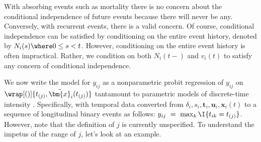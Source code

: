 \documentclass[article]{jss}
\begin{document}
With absorbing events such as mortality there is no concern about the
conditional independence of future events because there will never be
any.  Conversely, with recurrent events, there is a valid concern.  Of
course, conditional independence can be satisfied by conditioning on
the entire event history, denoted by $N_i(s) \where 0\le s < t$.
However, conditioning on the entire event history is often impractical.
Rather, we condition on both $N_i(t-)$ and $v_i(t)$ to satisfy any
concern of conditional independence.

We now write the model for $y_{ij}$ as a nonparametric probit
regression of $y_{ij}$ on
$\wrap[()]{t_{(j)}, \tilde{\bm{x}}_i(t_{(j)})}$ tantamount to
parametric models of discrete-time intensity
\citep{Thom77,ArjaHaar87,Fahr14}.  Specifically, with
temporal data converted from
$\delta_i, s_i, \bm{t}_{i}, \bm{u}_{i}, \bm{x}_i(t)$ to a sequence of
longitudinal binary events as follows:
$y_{ij}\ =\ \max_k \I{t_{ik}=t_{(j)}}$. %
However, note that the definition of $j$ is currently unspecified.
To understand the impetus of the range of $j$, let's look at an example.
\end{document}
